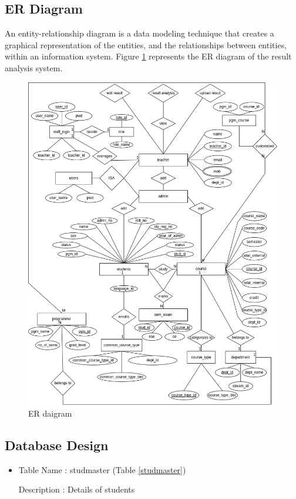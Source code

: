 \documentclass{nascproject}
\begin{document}
\subsection{ER Diagram}
An entity-relationship diagram is a data modeling technique that creates a graphical
representation of the entities, and the relationships between entities, within an information
system. Figure \ref{er} represents the ER diagram of the result analysis system.
\begin{figure}
	\centering
	\includegraphics[width=1\linewidth]{er.png}
	\caption{ER daigram}
	\label{er}
\end{figure}
\subsection{Database Design}

\begin{itemize}
	\item Table Name : stud\textunderscore master (Table \ref{studmaster})
	
	Description : Details of students
\end{itemize}
\end{document}
